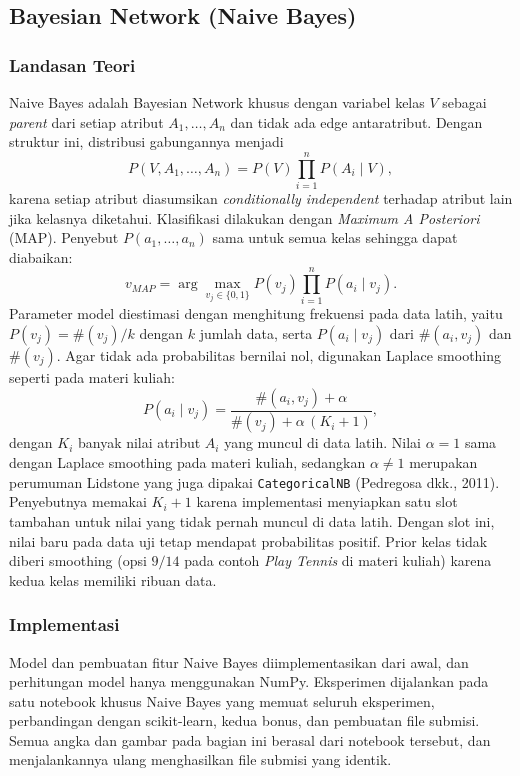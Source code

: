 \clearpage
\subsection{Bayesian Network (Naive Bayes)}
\sloppy

\subsubsection{Landasan Teori}
Naive Bayes adalah Bayesian Network khusus dengan variabel kelas $V$ sebagai
\textit{parent} dari setiap atribut $A_1,\dots,A_n$ dan tidak ada edge antaratribut.
Dengan struktur ini, distribusi gabungannya menjadi
\[
  P(V, A_1, \dots, A_n) = P(V)\prod_{i=1}^{n} P(A_i \mid V),
\]
karena setiap atribut diasumsikan \textit{conditionally independent} terhadap atribut
lain jika kelasnya diketahui. Klasifikasi dilakukan dengan \textit{Maximum A Posteriori}
(MAP). Penyebut $P(a_1,\dots,a_n)$ sama untuk semua kelas sehingga dapat diabaikan:
\[
  v_{MAP} = \arg\max_{v_j \in \{0,1\}} P(v_j)\prod_{i=1}^{n} P(a_i \mid v_j).
\]
Parameter model diestimasi dengan menghitung frekuensi pada data latih, yaitu
$P(v_j) = \#(v_j)/k$ dengan $k$ jumlah data, serta $P(a_i \mid v_j)$ dari
$\#(a_i, v_j)$ dan $\#(v_j)$. Agar tidak ada probabilitas bernilai nol, digunakan
Laplace smoothing seperti pada materi kuliah:
\[
  P(a_i \mid v_j) = \frac{\#(a_i, v_j) + \alpha}{\#(v_j) + \alpha\,(K_i + 1)},
\]
dengan $K_i$ banyak nilai atribut $A_i$ yang muncul di data latih. Nilai
$\alpha = 1$ sama dengan Laplace smoothing pada materi kuliah, sedangkan
$\alpha \neq 1$ merupakan perumuman Lidstone yang juga dipakai
\texttt{CategoricalNB} (Pedregosa dkk., 2011). Penyebutnya memakai $K_i + 1$ karena
implementasi menyiapkan satu slot tambahan untuk nilai yang tidak pernah muncul
di data latih. Dengan slot ini, nilai baru pada data uji tetap mendapat probabilitas
positif. Prior kelas tidak diberi smoothing (opsi $9/14$ pada contoh
\textit{Play Tennis} di materi kuliah) karena kedua kelas memiliki ribuan data.

\subsubsection{Implementasi}
Model dan pembuatan fitur Naive Bayes diimplementasikan dari awal, dan
perhitungan model hanya menggunakan NumPy. Eksperimen dijalankan pada satu notebook
khusus Naive Bayes yang memuat seluruh eksperimen, perbandingan dengan scikit-learn, kedua bonus, dan pembuatan file
submisi. Semua angka dan gambar pada bagian ini berasal dari notebook tersebut, dan
menjalankannya ulang menghasilkan file submisi yang identik.

